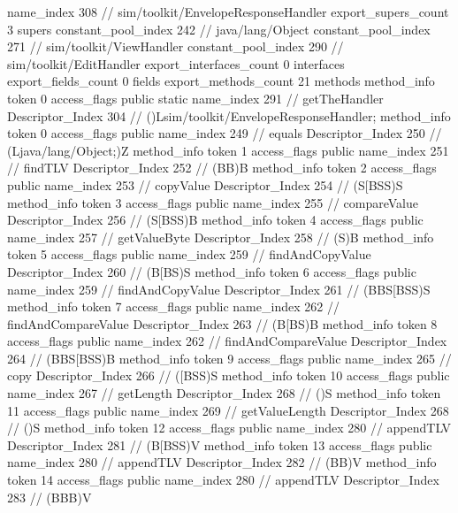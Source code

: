 {{{			name_index	308		// sim/toolkit/EnvelopeResponseHandler
			export_supers_count	3
			supers {
				constant_pool_index	242		// java/lang/Object
				constant_pool_index	271		// sim/toolkit/ViewHandler
				constant_pool_index	290		// sim/toolkit/EditHandler
			}
			export_interfaces_count	0
			interfaces {
			}
			export_fields_count	0
			fields {
			}
			export_methods_count	21
			methods {
				method_info {
					token	0
					access_flags	public static
					name_index	291		// getTheHandler
					Descriptor_Index	304		// ()Lsim/toolkit/EnvelopeResponseHandler;
				}
				method_info {
					token	0
					access_flags	public
					name_index	249		// equals
					Descriptor_Index	250		// (Ljava/lang/Object;)Z
				}
				method_info {
					token	1
					access_flags	public
					name_index	251		// findTLV
					Descriptor_Index	252		// (BB)B
				}
				method_info {
					token	2
					access_flags	public
					name_index	253		// copyValue
					Descriptor_Index	254		// (S[BSS)S
				}
				method_info {
					token	3
					access_flags	public
					name_index	255		// compareValue
					Descriptor_Index	256		// (S[BSS)B
				}
				method_info {
					token	4
					access_flags	public
					name_index	257		// getValueByte
					Descriptor_Index	258		// (S)B
				}
				method_info {
					token	5
					access_flags	public
					name_index	259		// findAndCopyValue
					Descriptor_Index	260		// (B[BS)S
				}
				method_info {
					token	6
					access_flags	public
					name_index	259		// findAndCopyValue
					Descriptor_Index	261		// (BBS[BSS)S
				}
				method_info {
					token	7
					access_flags	public
					name_index	262		// findAndCompareValue
					Descriptor_Index	263		// (B[BS)B
				}
				method_info {
					token	8
					access_flags	public
					name_index	262		// findAndCompareValue
					Descriptor_Index	264		// (BBS[BSS)B
				}
				method_info {
					token	9
					access_flags	public
					name_index	265		// copy
					Descriptor_Index	266		// ([BSS)S
				}
				method_info {
					token	10
					access_flags	public
					name_index	267		// getLength
					Descriptor_Index	268		// ()S
				}
				method_info {
					token	11
					access_flags	public
					name_index	269		// getValueLength
					Descriptor_Index	268		// ()S
				}
				method_info {
					token	12
					access_flags	public
					name_index	280		// appendTLV
					Descriptor_Index	281		// (B[BSS)V
				}
				method_info {
					token	13
					access_flags	public
					name_index	280		// appendTLV
					Descriptor_Index	282		// (BB)V
				}
				method_info {
					token	14
					access_flags	public
					name_index	280		// appendTLV
					Descriptor_Index	283		// (BBB)V
}}}}}
